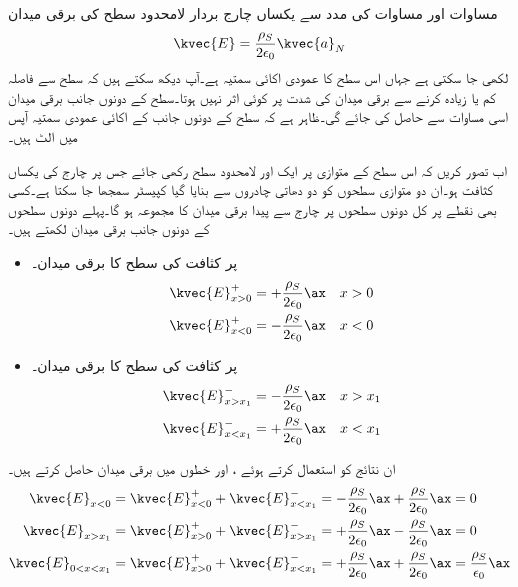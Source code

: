 مساوات  اور مساوات  کی مدد سے یکساں چارج بردار لامحدود سطح کی برقی میدان
\begin{align}\label{مساوات_کولومب_لامحدود_سطح_کی_برقی-میدان}
\kvec{E}=\frac{\rho_S}{2 \epsilon_0}\kvec{a}_N
\end{align}
لکھی جا سکتی ہے جہاں  اس سطح کا عمودی اکائی سمتیہ ہے۔آپ دیکھ سکتے ہیں کہ سطح سے فاصلہ کم یا زیادہ کرنے سے برقی میدان کی شدت پر کوئی اثر نہیں ہوتا۔سطح کے دونوں جانب برقی میدان اسی مساوات سے حاصل کی جائے گی۔ظاہر ہے کہ سطح کے دونوں جانب کے اکائی عمودی سمتیہ آپس میں الٹ ہیں۔

اب تصور کریں کہ اس سطح کے متوازی  پر  ایک اور لامحدود سطح  رکھی جائے جس پر چارج کی یکساں کثافت  ہو۔ان دو متوازی سطحوں کو دو دھاتی چادروں سے بنایا گیا کپیسٹر سمجھا جا سکتا ہے۔کسی بھی نقطے پر کل  دونوں سطحوں پر چارج سے پیدا برقی میدان کا مجموعہ ہو گا۔پہلے دونوں سطحوں کے دونوں جانب برقی میدان لکھتے ہیں۔ 
\begin{itemize}
\item
{} پر  کثافت کی سطح کا برقی میدان۔
\begin{align*}
\kvec{E}_{x>0}^{+}&=+\frac{\rho_S}{2\epsilon_0} \ax &x>0\\
\kvec{E}_{x<0}^{+}&=-\frac{\rho_S}{2\epsilon_0} \ax &x<0
\end{align*} 
\item
{} پر  کثافت کی سطح کا برقی میدان۔
\begin{align*}
\kvec{E}_{x>x_1}^{-}&=-\frac{\rho_S}{2\epsilon_0} \ax &x>x_1\\
\kvec{E}_{x<x_1}^{-}&=+\frac{\rho_S}{2\epsilon_0} \ax &x<x_1
\end{align*} 

\end{itemize}
ان نتائج کو استعمال کرتے ہوئے ، اور  خطوں میں برقی میدان حاصل کرتے ہیں۔
\begin{gather}
\begin{aligned}
\kvec{E}_{x<0}&=\kvec{E}_{x<0}^{+} +\kvec{E}_{x<x_1}^-=-\frac{\rho_S}{2\epsilon_0} \ax+\frac{\rho_S}{2\epsilon_0} \ax =0\\
\kvec{E}_{x>x_1}&=\kvec{E}_{x>0}^{+} +\kvec{E}_{x>x_1}^{-}=+\frac{\rho_S}{2\epsilon_0} \ax-\frac{\rho_S}{2\epsilon_0} \ax=0\\
\kvec{E}_{0<x<x_1}&=\kvec{E}_{x>0}^{+}+\kvec{E}_{x<x_1}^{-}=+\frac{\rho_S}{2\epsilon_0} \ax+\frac{\rho_S}{2\epsilon_0} \ax =\frac{\rho_S}{\epsilon_0} \ax
\end{aligned}
\end{gather}

